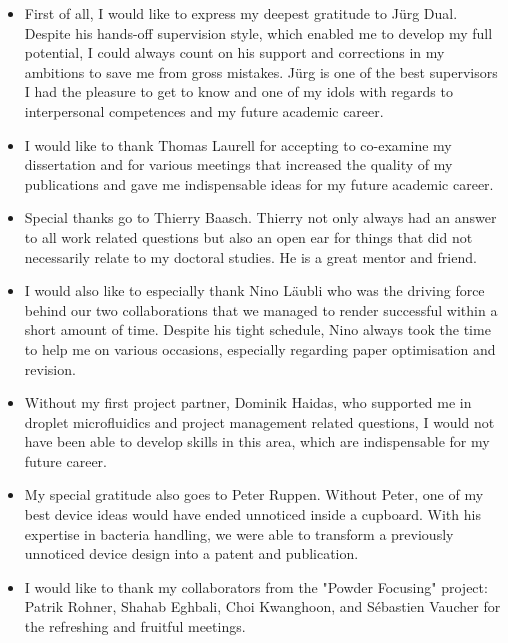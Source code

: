 \begin{itemize}

\item First of all, I would like to express my deepest gratitude to Jürg Dual. 
  Despite his hands-off supervision style, which enabled me to develop my full 
  potential, I could always count on his support and corrections in my 
  ambitions to save me from gross mistakes. Jürg is one of the best supervisors 
  I had the pleasure to get to know and one of my idols with regards to 
  interpersonal competences and my future academic career.

\item I would like to thank Thomas Laurell for accepting to co-examine my 
  dissertation and for various meetings that increased the quality of my 
  publications and gave me indispensable ideas for my future academic career.

\item Special thanks go to Thierry Baasch. Thierry not only always had an 
  answer to all work related questions but also an open ear for things that did 
  not necessarily relate to my doctoral studies. He is a great mentor and 
  friend.

\item I would also like to especially thank Nino Läubli who was the driving 
  force behind our two collaborations that we managed to render successful 
  within a short amount of time. Despite his tight schedule, Nino always took 
  the time to help me on various occasions, especially regarding paper 
  optimisation and revision.

\item Without my first project partner, Dominik Haidas, who supported me in 
  droplet microfluidics and project management related questions, I would not 
  have been able to develop skills in this area, which are indispensable for my 
  future career.

\item My special gratitude also goes to Peter Ruppen. Without Peter, one of my 
  best device ideas would have ended unnoticed inside a cupboard. With his 
  expertise in bacteria handling, we were able to transform a previously 
  unnoticed device design into a patent and publication.

\item I would like to thank my collaborators from the "Powder Focusing" 
  project: Patrik Rohner, Shahab Eghbali, Choi Kwanghoon, and S\'ebastien 
  Vaucher for the refreshing and fruitful meetings.


\end{itemize}
